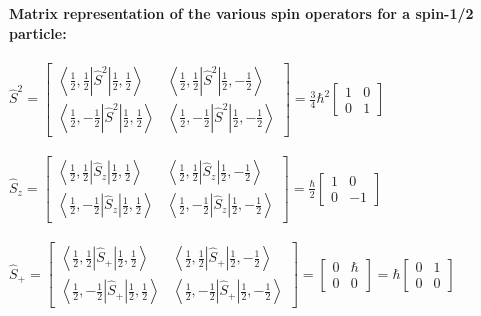 \textbf{ Matrix representation of the various spin operators for a spin-1/2 particle:}\\\\
$\hat{S}^{2}=\left[\begin{array}{ll}
	\left\langle\frac{1}{2}, \frac{1}{2}\left|\hat{S}^{2}\right| \frac{1}{2}, \frac{1}{2}\right\rangle & \left\langle\frac{1}{2}, \frac{1}{2}\left|\hat{S}^{2}\right| \frac{1}{2},-\frac{1}{2}\right\rangle \\
	\left\langle\frac{1}{2},-\frac{1}{2}\left|\hat{S}^{2}\right| \frac{1}{2}, \frac{1}{2}\right\rangle & \left\langle\frac{1}{2},-\frac{1}{2}\left|\hat{S}^{2}\right| \frac{1}{2},-\frac{1}{2}\right\rangle
\end{array}\right]=\frac{3}{4} \hbar^{2}\left[\begin{array}{ll}
	1 & 0 \\
	0 & 1
\end{array}\right]$\\\\

$\hat{S}_{z}=\left[\begin{array}{ll}
	\left\langle\frac{1}{2}, \frac{1}{2}\left|\hat{S}_{z}\right| \frac{1}{2}, \frac{1}{2}\right\rangle & \left\langle\frac{1}{2}, \frac{1}{2}\left|\hat{S}_{z}\right| \frac{1}{2},-\frac{1}{2}\right\rangle \\
	\left\langle\frac{1}{2},-\frac{1}{2}\left|\hat{S}_{z}\right| \frac{1}{2}, \frac{1}{2}\right\rangle & \left\langle\frac{1}{2},-\frac{1}{2}\left|\hat{S}_{z}\right| \frac{1}{2},-\frac{1}{2}\right\rangle
\end{array}\right]=\frac{\hbar}{2}\left[\begin{array}{cc}
	1 & 0 \\
	0 & -1
\end{array}\right]$\\\\

$\hat{S}_{+}=\left[\begin{array}{cc}
	\left\langle\frac{1}{2}, \frac{1}{2}\left|\hat{S}_{+}\right| \frac{1}{2}, \frac{1}{2}\right\rangle & \left\langle\frac{1}{2}, \frac{1}{2}\left|\hat{S}_{+}\right| \frac{1}{2},-\frac{1}{2}\right\rangle \\
	\left\langle\frac{1}{2},-\frac{1}{2}\left|\hat{S}_{+}\right| \frac{1}{2}, \frac{1}{2}\right\rangle & \left\langle\frac{1}{2},-\frac{1}{2}\left|\hat{S}_{+}\right| \frac{1}{2},-\frac{1}{2}\right\rangle
\end{array}\right]=\left[\begin{array}{ll}
	0 & \hbar \\
	0 & 0
\end{array}\right]=\hbar\left[\begin{array}{ll}
	0 & 1 \\
	0 & 0
\end{array}\right]$\\\\

